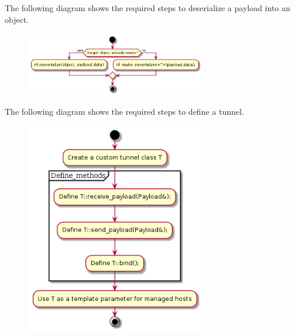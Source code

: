 \documentclass[11pt]{report}
\newcommand{\+}{\discretionary{\mbox{\scriptsize$\hookleftarrow$}}{}{}}
\begin{document}
                The following diagram shows the required steps to deserialize a payload into an object.

                \begin{figure}[H]
                \centering
                \includegraphics[width=0.7\textwidth]{d/ac/def_deserialize_obj.png}
                \end{figure}





                The following diagram shows the required steps to define a tunnel.

                \begin{figure}[H]
                \centering
                \includegraphics[width=0.7\textwidth]{d/ac/def_tunnel.png}
                \end{figure}
\end{document}
